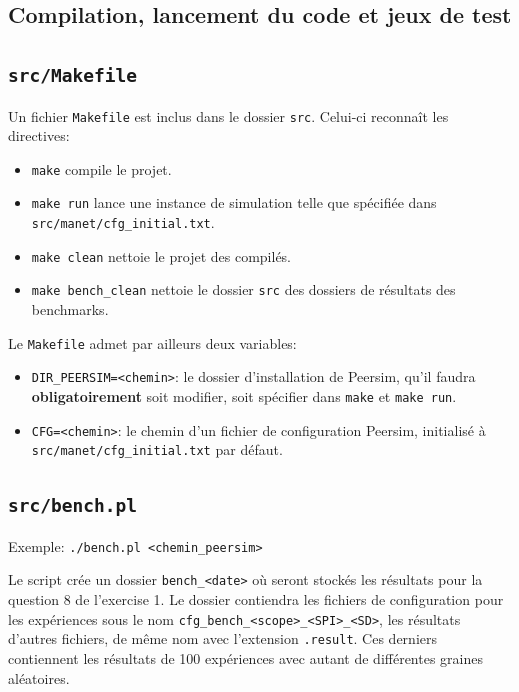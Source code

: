 \documentclass[a4paper]{article}
\begin{document}
\begin{appendix}
  \section{Compilation, lancement du code et jeux de test}
  \subsection{\texttt{src/Makefile}}
    Un fichier \texttt{Makefile} est inclus dans le dossier
    \texttt{src}. Celui-ci reconnaît les directives:
    \begin{itemize}
    \item \texttt{make} compile le projet.
    \item \texttt{make run} lance une instance de simulation telle que
      spécifiée dans \texttt{src/manet/cfg\_initial.txt}.
    \item \texttt{make clean} nettoie le projet des compilés.
    \item \texttt{make bench\_clean} nettoie le dossier \texttt{src}
      des dossiers de résultats des benchmarks.\\
    \end{itemize}

    Le \texttt{Makefile} admet par ailleurs deux variables:
    \begin{itemize}
    \item \texttt{DIR\_PEERSIM=<chemin>}: le dossier d'installation de
      Peersim, qu'il faudra \textbf{obligatoirement} soit modifier,
      soit spécifier dans \texttt{make} et \texttt{make run}.
    \item \texttt{CFG=<chemin>}: le chemin d'un fichier de
      configuration Peersim, initialisé à \texttt{src/manet/cfg\_initial.txt} par défaut.
    \end{itemize}

    \subsection{\texttt{src/bench.pl}}
    Exemple: \texttt{./bench.pl <chemin\_peersim>}

    Le script crée un dossier \texttt{bench\_<date>} où seront stockés les
    résultats pour la question 8 de l'exercise 1. Le dossier contiendra
    les fichiers de configuration pour les expériences sous le nom
    \texttt{cfg\_bench\_<scope>\_<SPI>\_<SD>}, les résultats d'autres
    fichiers, de même nom avec l'extension \texttt{.result}. Ces derniers contiennent les résultats de 100 expériences avec autant de différentes graines aléatoires.


\end{appendix}
\end{document}

